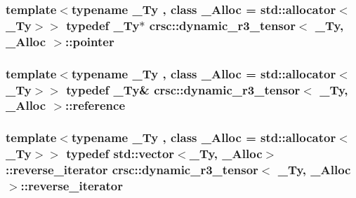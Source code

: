 \subsubsection[{\texorpdfstring{pointer}{pointer}}]{\setlength{\rightskip}{0pt plus 5cm}template$<$typename \+\_\+\+Ty , class \+\_\+\+Alloc  = std\+::allocator$<$\+\_\+\+Ty$>$$>$ typedef \+\_\+\+Ty$\ast$ {\bf crsc\+::dynamic\+\_\+r3\+\_\+tensor}$<$ \+\_\+\+Ty, \+\_\+\+Alloc $>$\+::{\bf pointer}}\hypertarget{classcrsc_1_1dynamic__r3__tensor_af0ce0fb7d1d534ab625b1cdc8ae56b8a}{}\label{classcrsc_1_1dynamic__r3__tensor_af0ce0fb7d1d534ab625b1cdc8ae56b8a}
\subsubsection[{\texorpdfstring{reference}{reference}}]{\setlength{\rightskip}{0pt plus 5cm}template$<$typename \+\_\+\+Ty , class \+\_\+\+Alloc  = std\+::allocator$<$\+\_\+\+Ty$>$$>$ typedef \+\_\+\+Ty\& {\bf crsc\+::dynamic\+\_\+r3\+\_\+tensor}$<$ \+\_\+\+Ty, \+\_\+\+Alloc $>$\+::{\bf reference}}\hypertarget{classcrsc_1_1dynamic__r3__tensor_a1a4d3cf01c93ee5b24b927236b1fd4b1}{}\label{classcrsc_1_1dynamic__r3__tensor_a1a4d3cf01c93ee5b24b927236b1fd4b1}
\subsubsection[{\texorpdfstring{reverse\+\_\+iterator}{reverse_iterator}}]{\setlength{\rightskip}{0pt plus 5cm}template$<$typename \+\_\+\+Ty , class \+\_\+\+Alloc  = std\+::allocator$<$\+\_\+\+Ty$>$$>$ typedef std\+::vector$<$\+\_\+\+Ty, \+\_\+\+Alloc$>$\+::{\bf reverse\+\_\+iterator} {\bf crsc\+::dynamic\+\_\+r3\+\_\+tensor}$<$ \+\_\+\+Ty, \+\_\+\+Alloc $>$\+::{\bf reverse\+\_\+iterator}}\hypertarget{classcrsc_1_1dynamic__r3__tensor_acc9533d771b0b766874a6c984bc3a31a}{}\label{classcrsc_1_1dynamic__r3__tensor_acc9533d771b0b766874a6c984bc3a31a}
